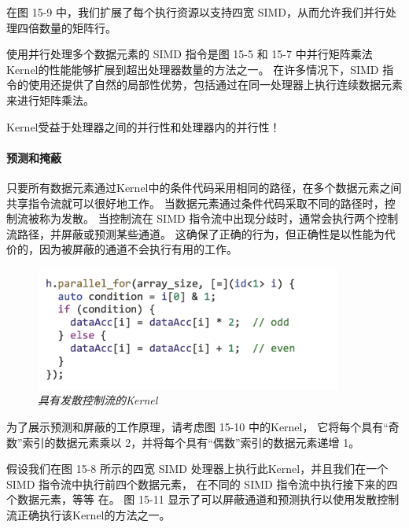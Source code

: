 在图 15-9 中，我们扩展了每个执行资源以支持四宽 SIMD，从而允许我们并行处理四倍数量的矩阵行。

使用并行处理多个数据元素的 SIMD 指令是图 15-5 
和 15-7 中并行矩阵乘法Kernel的性能能够扩展到超出处理器数量的方法之一。 
在许多情况下，SIMD 指令的使用还提供了自然的局部性优势，包括通过在同一处理器上执行连续数据元素来进行矩阵乘法。

\begin{remark}
	Kernel受益于处理器之间的并行性和处理器内的并行性！
\end{remark}

\paragraph{预测和掩蔽}

只要所有数据元素通过Kernel中的条件代码采用相同的路径，在多个数据元素之间共享指令流就可以很好地工作。 
当数据元素通过条件代码采取不同的路径时，控制流被称为发散。 
当控制流在 SIMD 指令流中出现分歧时，通常会执行两个控制流路径，并屏蔽或预测某些通道。 
这确保了正确的行为，但正确性是以性能为代价的，因为被屏蔽的通道不会执行有用的工作。

\begin{figure}[H]
	\centering
	\includegraphics[width=0.9\textwidth]{figs/F15.10.png}
	\caption{\textit{具有发散控制流的Kernel }}
\end{figure}

为了展示预测和屏蔽的工作原理，请考虑图 15-10 中的Kernel，
它将每个具有“奇数”索引的数据元素乘以 2，并将每个具有“偶数”索引的数据元素递增 1。

假设我们在图 15-8 所示的四宽 SIMD 处理器上执行此Kernel，并且我们在一个 SIMD 指令流中执行前四个数据元素，
在不同的 SIMD 指令流中执行接下来的四个数据元素，等等 在。 
图 15-11 显示了可以屏蔽通道和预测执行以使用发散控制流正确执行该Kernel的方法之一。

